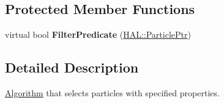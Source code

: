 \subsection*{Protected Member Functions}
\begin{DoxyCompactItemize}
\item 
\hypertarget{class_h_a_l_1_1_algorithms_1_1_select_particle_af19a208179b5c2da43bdd010ec7355cd}{virtual bool {\bfseries Filter\+Predicate} (\hyperlink{class_h_a_l_1_1_generic_particle}{H\+A\+L\+::\+Particle\+Ptr})}\label{class_h_a_l_1_1_algorithms_1_1_select_particle_af19a208179b5c2da43bdd010ec7355cd}

\end{DoxyCompactItemize}


\subsection{Detailed Description}
\hyperlink{class_h_a_l_1_1_algorithm}{Algorithm} that selects particles with specified properties. 

